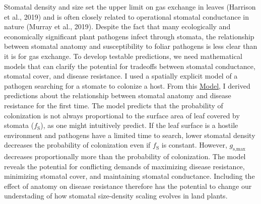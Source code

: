 \documentclass[utf8]{frontiersSCNS}
\newcommand{\fs}{$f_\text{S}$}
\newcommand{\gsmax}{$g_\text{s,max}$}
\begin{document}
Stomatal density and size set the upper limit on gas exchange in leaves
(Harrison et al., 2019) and is often closely related to operational
stomatal conductance in nature (Murray et al., 2019). Despite the fact
that many ecologically and economically significant plant pathogens
infect through stomata, the relationship between stomatal anatomy and
susceptibility to foliar pathogens is less clear than it is for gas
exchange. To develop testable predictions, we need mathematical models
that can clarify the potential for tradeoffs between stomatal
conductance, stomatal cover, and disease resistance. I used a spatially
explicit model of a pathogen searching for a stomate to colonize a host.
From this \protect\hyperlink{model}{Model}, I derived predictions about
the relationship between stomatal anatomy and disease resistance for the
first time. The model predicts that the probability of colonization is
not always proportional to the surface area of leaf covered by stomata
(\fs), as one might intuitively predict. If the leaf surface is a
hostile environment and pathogens have a limited time to search, lower
stomatal density decreases the probability of colonization even if \fs{}
is constant. However, \gsmax{} decreases proportionally more than the
probability of colonization. The model reveals the potential for
conflicting demands of maximizing disease resistance, minimizing
stomatal cover, and maintaining stomatal conductance. Including the
effect of anatomy on disease resistance therefore has the potential to
change our understading of how stomatal size-density scaling evolves in
land plants.
\end{document}
